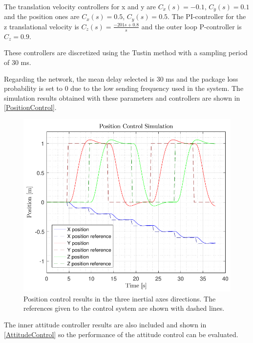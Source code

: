 The translation velocity controllers for x and y are $C_{\dot{x}}(s)= -0.1$, $C_{\dot{y}}(s)= 0.1$ and the position ones are $C_x(s)= 0.5$, $C_y(s)= 0.5$. The PI-controller for the z translational velocity is $C_{\dot{z}}(s)=\frac{-201s+0.8}{s}$ and the outer loop P-controller is $C_z=0.9$.

These controllers are discretized using the Tustin method with a sampling period of 30 ms. 

Regarding the network, the mean delay selected is 30 ms and the package loss probability is set to 0 due to the low sending frequency used in the system.
The simulation results obtained with these parameters and controllers are shown in \autoref{PositionControl}.
\begin{figure}[H]
	\centering
	\includegraphics[scale=0.55]{figures/PositionControl}
	\caption{Position control results in the three inertial axes directions. The references given to the control system are shown with dashed lines.}
	\label{PositionControl}
\end{figure}

The inner attitude controller results are also included and shown in \autoref{AttitudeControl} so the performance of the attitude control can be evaluated. 

